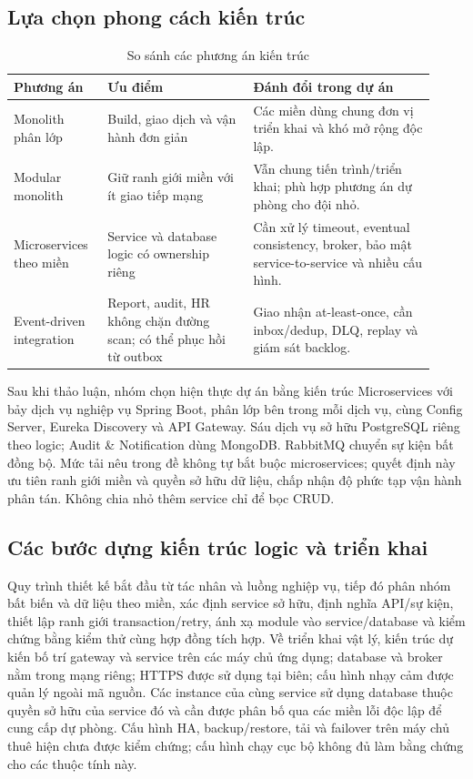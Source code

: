 \subsection{Lựa chọn phong cách kiến trúc}
\label{subsec:style-choice}
\begin{table}[htbp]
\centering
\caption{So sánh các phương án kiến trúc}\label{tab:styles}
\begin{tabular}{|>{\raggedright\arraybackslash}p{0.20\linewidth}|>{\raggedright\arraybackslash}p{0.32\linewidth}|>{\raggedright\arraybackslash}p{0.40\linewidth}|}\hline
\textbf{Phương án} & \textbf{Ưu điểm} & \textbf{Đánh đổi trong dự án} \\\hline
Monolith phân lớp & Build, giao dịch và vận hành đơn giản & Các miền dùng chung đơn vị triển khai và khó mở rộng độc lập. \\\hline
Modular monolith & Giữ ranh giới miền với ít giao tiếp mạng & Vẫn chung tiến trình/triển khai; phù hợp phương án dự phòng cho đội nhỏ. \\\hline
Microservices theo miền & Service và database logic có ownership riêng & Cần xử lý timeout, eventual consistency, broker, bảo mật service-to-service và nhiều cấu hình. \\\hline
Event-driven integration & Report, audit, HR không chặn đường scan; có thể phục hồi từ outbox & Giao nhận at-least-once, cần inbox/dedup, DLQ, replay và giám sát backlog. \\\hline
\end{tabular}
\end{table}

Sau khi thảo luận, nhóm chọn hiện thực dự án bằng kiến trúc Microservices với bảy dịch vụ nghiệp vụ Spring Boot, phân lớp bên trong mỗi dịch vụ, cùng Config Server, Eureka Discovery và API Gateway. Sáu dịch vụ sở hữu PostgreSQL riêng theo logic; Audit \& Notification dùng MongoDB. RabbitMQ chuyển sự kiện bất đồng bộ. Mức tải nêu trong đề không tự bắt buộc microservices; quyết định này ưu tiên ranh giới miền và quyền sở hữu dữ liệu, chấp nhận độ phức tạp vận hành phân tán. Không chia nhỏ thêm service chỉ để bọc CRUD.

\subsection{Các bước dựng kiến trúc logic và triển khai}
\label{subsec:architecture-steps}
Quy trình thiết kế bắt đầu từ tác nhân và luồng nghiệp vụ, tiếp đó phân nhóm bất biến và dữ liệu theo miền, xác định service sở hữu, định nghĩa API/sự kiện, thiết lập ranh giới transaction/retry, ánh xạ module vào service/database và kiểm chứng bằng kiểm thử cùng hợp đồng tích hợp. Về triển khai vật lý, kiến trúc dự kiến bố trí gateway và service trên các máy chủ ứng dụng; database và broker nằm trong mạng riêng; HTTPS được sử dụng tại biên; cấu hình nhạy cảm được quản lý ngoài mã nguồn. Các instance của cùng service sử dụng database thuộc quyền sở hữu của service đó và cần được phân bố qua các miền lỗi độc lập để cung cấp dự phòng. Cấu hình HA, backup/restore, tải và failover trên máy chủ thuê hiện chưa được kiểm chứng; cấu hình chạy cục bộ không đủ làm bằng chứng cho các thuộc tính này.

